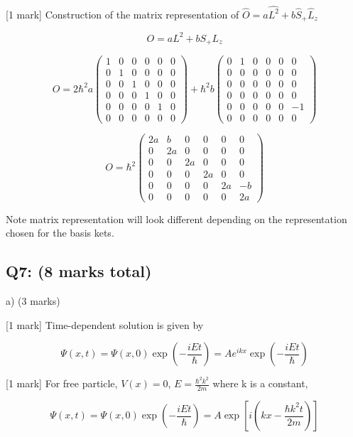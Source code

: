 \documentclass[a4paper,11pt]{article}
\begin{document}
[1 mark] Construction of the matrix representation of \( \hat{O} = a\hat{L^{2}} + b\hat{S}_{+}\hat{L}_{z} \)

\[ O = a L^2 + b S_{+}L_z \]

\[
O = 2\hbar^2 a \begin{pmatrix} 1 & 0 & 0 & 0 & 0 & 0\\  0 & 1 & 0 & 0 & 0 & 0\\ 0 & 0 & 1 & 0 & 0 & 0\\ 0 & 0 & 0 & 1 & 0 & 0\\ 0 & 0 & 0 & 0 & 1 & 0\\ 0 & 0 & 0 & 0 & 0 & 0 \end{pmatrix} + \hbar^2 b \begin{pmatrix} 0 & 1 & 0 & 0 & 0 & 0\\ 0 & 0 & 0 & 0 & 0 & 0\\ 0 & 0 & 0 & 0 & 0 & 0\\ 0 & 0 & 0 & 0 & 0 & 0\\ 0 & 0 & 0 & 0 & 0 & -1\\ 0 & 0 & 0 & 0 & 0 & 0 \end{pmatrix}
\]

\[ 
O = \hbar^2 \begin{pmatrix} 2a & b & 0 & 0 & 0 & 0\\ 0 & 2a & 0 & 0 & 0 & 0\\ 0 & 0 & 2a & 0 & 0 & 0\\ 0 & 0 & 0 & 2a & 0 & 0\\ 0 & 0 & 0 & 0 & 2a & -b\\ 0 & 0 & 0 & 0 & 0 & 2a \end{pmatrix}
\]

Note matrix representation will look different depending on the representation chosen for the basis kets. 

\subsection*{Q7: (8 marks total)}

a) (3 marks)

[1 mark] Time-dependent solution is given by 

\[ \Psi(x,t) = \Psi(x,0) \exp(- \frac{iEt}{\hbar}) =  Ae^{ikx} \exp(- \frac{iEt}{\hbar})  \]

[1 mark] For free particle, \( V(x) = 0 \), \( E = \frac{\hbar^2 k^2}{2m} \) where k is a constant, 

\[ \Psi(x,t) = \Psi(x,0) \exp(- \frac{iEt}{\hbar}) =  A \exp\left[ i \left( kx - \frac{\hbar k^2 t}{2m} \right) \right] \]
\end{document}
